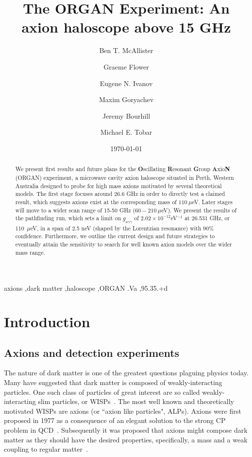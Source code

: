 \documentclass[preprint]{elsarticle}
\begin{document}
\title{The ORGAN Experiment: An axion haloscope above 15 GHz}


\author[equs]{Ben T. McAllister}
\author[equs]{Graeme Flower}
\author[phys]{Eugene N. Ivanov}
\author[equs]{Maxim Goryachev}
\author[equs]{Jeremy Bourhill}
\author[equs]{Michael E. Tobar}
\address[equs]{ARC Centre of Excellence for Engineered Quantum Systems, School of Physics, The University of Western Australia, Crawley 6009, Australia}
\address[phys]{School of Physics, The University of Western Australia, Crawley 6009, Australia}
\date{\today}

\begin{abstract}
We present first results and future plans for the {\bfseries{O}}scillating {\bfseries{R}}esonant {\bfseries{G}}roup {\bfseries{A}}xio{\bfseries{N}} (ORGAN) experiment, a microwave cavity axion haloscope situated in Perth, Western Australia designed to probe for high mass axions motivated by several theoretical models. The first stage focuses around 26.6 GHz in order to directly test a claimed result, which suggests axions exist at the corresponding mass of $110~\mu$eV. Later stages will move to a wider scan range of 15-50 GHz ($60-210~\mu $eV). We present the results of the pathfinding run, which sets a limit on $g_{a\gamma\gamma}$ of $2.02\times 10^{-12} $eV$^{-1}$ at 26.531 GHz, or 110~$\mu$eV, in a span of 2.5 neV (shaped by the Lorentzian resonance) with $90 \%$ confidence. Furthermore, we outline the current design and future strategies to eventually attain the sensitivity to search for well known axion models over the wider mass range. 
\end{abstract}

\begin{keyword}
axions \sep dark matter \sep haloscope \sep ORGAN 
.Va \sep 95.35.+d
\end{keyword}
\maketitle

\section{Introduction}
\subsection{Axions and detection experiments}
The nature of dark matter is one of the greatest questions plaguing physics today. Many have suggested that dark matter is composed of weakly-interacting particles. One such class of particles of great interest are so called weakly-interacting slim particles, or WISPs~\cite{wisps}. The most well known and theoretically motivated WISPs are axions (or ``axion like particles", ALPs). Axions were first proposed in 1977 as a consequence of an elegant solution to the strong CP problem in QCD~\cite{PQ1977}. Subsequently it was proposed that axions might compose dark matter as they should have the desired properties, specifically, a mass and a weak coupling to regular matter~\cite{Sikivie1983b}.
\end{document}
